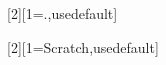 %
%
%
%

[2][1={.},usedefault]{
}

\newcommand*{\draftnote}[1]{%
    \pseudotodo{#1}
}

\newcommand*{\guidance}[1]{%
    \pseudotodo[black!050]{\textsc{#1}}
}

\newcommand*{\outline}[1]{%
    \pseudotodo[blue!080]{#1}
}





%
%
\newcommand{\gib}{\gibi\byte}
\newcommand{\mib}{\mebi\byte}
\newcommand{\kib}{\kibi\byte}



%
%
%

\newlength{\intomarginwidth}
\addtolength{\intomarginwidth}{\linewidth}
\addtolength{\intomarginwidth}{\marginparsep}
\addtolength{\intomarginwidth}{\marginparwidth}

[2][1={Scratch},usedefault]{%
}



